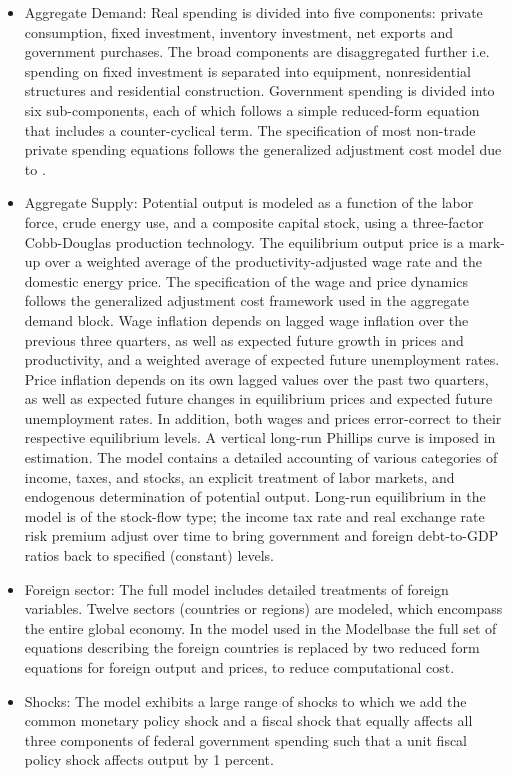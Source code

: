 \documentclass[11pt,a4paper]{article}
\begin{document}
	\begin{itemize}
		\item Aggregate Demand: Real spending is divided into five components: private consumption, fixed investment, inventory investment, net exports and government purchases. The broad components are disaggregated further i.e. spending on fixed investment is separated into equipment, nonresidential structures and residential construction. Government spending is divided into six sub-components, each of which follows a simple reduced-form equation that includes a counter-cyclical term. The specification of most non-trade private spending equations follows the generalized adjustment cost model due to \cite{Tinsley1993}.
		\item Aggregate Supply: Potential output is modeled as a function of the labor force, crude energy use, and a composite capital stock, using a three-factor Cobb-Douglas production technology. The equilibrium output price is a mark-up over a weighted average of the productivity-adjusted wage rate and the domestic energy price. The specification of the wage and price dynamics follows the generalized adjustment cost framework used in the aggregate demand block. Wage inflation depends on lagged wage inflation over the previous three quarters, as well as expected future growth in prices and productivity, and a weighted average of expected future unemployment rates. Price inflation depends on its own lagged values over the past two quarters, as well as expected future changes in equilibrium prices and expected future unemployment rates. In addition, both wages and prices error-correct to their respective equilibrium levels. A vertical long-run Phillips curve is imposed in estimation. The model contains a detailed accounting of various categories of income, taxes, and stocks, an explicit treatment of labor markets, and endogenous determination of potential output. Long-run equilibrium in the model is of the stock-flow type; the income tax rate and real exchange rate risk premium adjust over time to bring government and foreign debt-to-GDP ratios back to specified (constant) levels.
		\item Foreign sector: The full model includes detailed treatments of foreign variables. Twelve sectors (countries or regions) are modeled, which encompass the entire global economy. In the model used in the Modelbase the full set of equations describing the foreign countries is replaced by two reduced form equations for foreign output and prices, to reduce computational cost.
		\item Shocks: The model exhibits a large range of shocks to which we add the common monetary policy shock and a fiscal shock that equally affects all three components of federal government spending such that a unit fiscal policy shock affects output by 1 percent.

\end{itemize}
\end{document}
